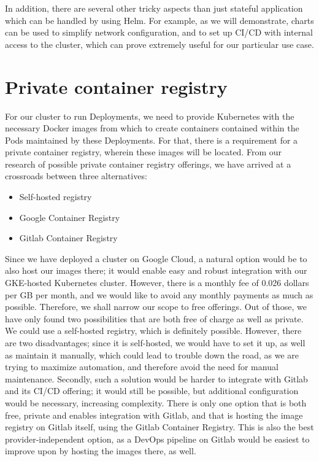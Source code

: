 \documentclass[thesis=B,english]{FITthesis}[2019/12/23]
\begin{document}
In addition, there are several other tricky aspects than just stateful application which can be handled by using Helm. For example, as we will demonstrate, charts can be used to simplify network configuration, and to set up CI/CD with internal access to the cluster, which can prove extremely useful for our particular use case.


\section{Private container registry}

For our cluster to run Deployments, we need to provide Kubernetes with the necessary Docker images from which to create containers contained within the Pods maintained by these Deployments. For that, there is a requirement for a private container registry, wherein these images will be located. From our research of possible private container registry offerings, we have arrived at a crossroads between three alternatives:

\begin{itemize}
  \setlength\itemsep{0em}
  \item Self-hosted registry
  \item Google Container Registry
  \item Gitlab Container Registry
\end{itemize}

Since we have deployed a cluster on Google Cloud, a natural option would be to also host our images there; it would enable easy and robust integration with our GKE-hosted Kubernetes cluster. However, there is a monthly fee of 0.026 dollars per GB per month, and we would like to avoid any monthly payments as much as possible. \cite{gcr-pricing} Therefore, we shall narrow our scope to free offerings. Out of those, we have only found two possibilities that are both free of charge as well as private. We could use a self-hosted registry, which is definitely possible. However, there are two disadvantages; since it is self-hosted, we would have to set it up, as well as maintain it manually, which could lead to trouble down the road, as we are trying to maximize automation, and therefore avoid the need for manual maintenance. Secondly, such a solution would be harder to integrate with Gitlab and its CI/CD offering; it would still be possible, but additional configuration would be necessary, increasing complexity. There is only one option that is both free, private and enables integration with Gitlab, and that is hosting the image registry on Gitlab itself, using the Gitlab Container Registry. This is also the best provider-independent option, as a DevOps pipeline on Gitlab would be easiest to improve upon by hosting the images there, as well.
\end{document}
